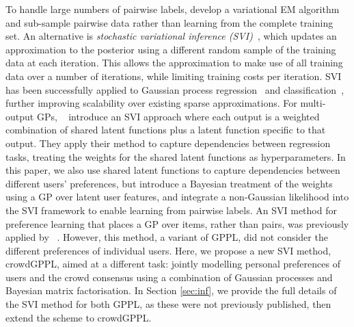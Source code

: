 To handle large numbers of pairwise labels, \citet{khan2014scalable}
develop a variational EM algorithm and sub-sample pairwise data rather than learning from the complete training set.
An alternative is \emph{stochastic variational inference (SVI)}~\citep{hoffman2013stochastic}, 
which updates an approximation to the posterior using 
a different random sample of the training data at each iteration. 
This allows the approximation to make use of all training data over a number of 
iterations, while limiting training costs per iteration.
SVI has been successfully applied to Gaussian process regression~\citep{hensman2013gaussian} and classification~\citep{hensman2015scalable},
further improving scalability over existing sparse approximations.
For multi-output GPs, ~\citet{nguyen2014collaborative} introduce an SVI approach where 
each output is a weighted combination of shared latent functions plus a latent function specific to that output. 
They apply their method to capture dependencies between regression tasks,
treating the weights for the shared latent functions as hyperparameters. 
In this paper, we also use shared latent functions to capture dependencies between different users' preferences,
but introduce a Bayesian treatment of the weights using a GP over latent user features,
and integrate a non-Gaussian likelihood into the SVI framework to enable learning from pairwise labels.
An SVI method for preference learning that places a GP over items, rather than pairs, 
was previously applied by ~\citet{simpson2018finding}.
However, this method, a variant of GPPL,
did not consider the different preferences of individual users.
Here, we propose a new SVI method, crowdGPPL, aimed at a different task: 
jointly modelling personal preferences of users and the crowd consensus
using a combination of Gaussian processes and Bayesian matrix factorisation.
In Section \ref{sec:inf},
we provide the full details of the SVI method for 
both GPPL, as these were not previously published, then extend the scheme to crowdGPPL.
